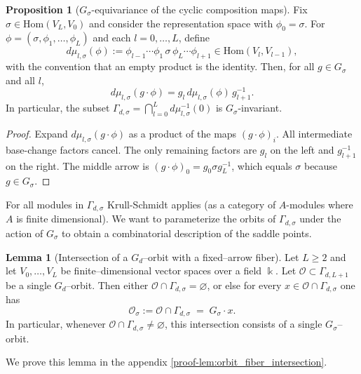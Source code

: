 \documentclass{article}
\theoremstyle{definition}
\newtheorem{proposition}[theorem]{Proposition}
\newtheorem{lemma}[theorem]{Lemma}
\begin{document}
\begin{proposition}[$G_\sigma$-equivariance of the cyclic composition maps]\label{prop:mu-sigma-equivariant}
Fix $\sigma\in\mathrm{Hom}(V_L,V_0)$ and consider the representation space with $\phi_{0}=\sigma$.
For $\phi=(\sigma,\phi_1,\ldots,\phi_L)$ and each $l=0,\ldots,L$, define
\[
d\mu_{l,\sigma}(\phi):=\phi_{l-1}\cdots \phi_1\,\sigma\,\phi_L\cdots \phi_{l+1}\in\mathrm{Hom}(V_{l},V_{l-1}),
\]
with the convention that an empty product is the identity.
Then, for all $g\in G_\sigma$ and all $l$,
\[
d\mu_{l,\sigma}(g\cdot \phi)= g_l\,d\mu_{l,\sigma}(\phi)\,g_{l+1}^{-1}.
\]
In particular, the subset $\Gamma_{d,\sigma}=\bigcap_{l=0}^L d\mu_{l,\sigma}^{-1}(0)$ is $G_\sigma$-invariant.
\end{proposition}

\begin{proof}
Expand $d\mu_{l,\sigma}(g\cdot\phi)$ as a product of the maps $(g\cdot\phi)_i$.
All intermediate base-change factors cancel. The only remaining factors are $g_l$ on the left and
$g_{l+1}^{-1}$ on the right. The middle arrow is $(g\cdot\phi)_{0}=g_0\sigma g_L^{-1}$, which equals
$\sigma$ because $g\in G_\sigma$. 
\end{proof}
\noindent
For all modules in $\Gamma_{d,\sigma}$ Krull-Schmidt applies (as a category of $A$-modules where $A$ is finite dimensional). We want to parameterize the orbits of $\Gamma_{d,\sigma}$ under the action of $G_\sigma$ to obtain a combinatorial description of the saddle points.
\begin{lemma}[Intersection of a $G_d$--orbit with a fixed--arrow fiber]
\label{lem:orbit_fiber_intersection}
Let $L\ge 2$ and let $V_0,\dots,V_L$ be finite--dimensional vector spaces over a field $\Bbbk$.  
Let $\mathcal O\subset \Gamma_{d,L+1}$ be a single $G_d$--orbit.  
Then either $\mathcal O\cap\Gamma_{d,\sigma}=\varnothing$, or else for every
$x\in\mathcal O\cap\Gamma_{d,\sigma}$ one has
\[
\mathcal O_{\sigma}:=\mathcal O\cap\Gamma_{d,\sigma} \;=\; G_\sigma\cdot x .
\]
In particular, whenever $\mathcal O\cap\Gamma_{d,\sigma}\neq\varnothing$, this
intersection consists of a single $G_\sigma$--orbit.
\end{lemma}
\noindent
We prove this lemma in the appendix \ref{proof-lem:orbit_fiber_intersection}.
\end{document}
